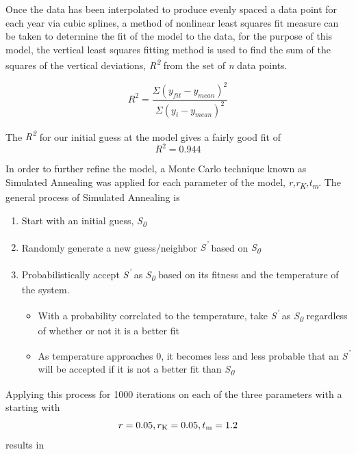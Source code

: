 \documentclass[12pt]{article}
\begin{document}
Once the data has been interpolated to produce evenly spaced a data point for each year via cubic splines, a method of nonlinear least squares fit measure can be taken to determine the fit of the model to the data, for the purpose of this model, the vertical least squares fitting method is used to find the sum of the squares of the vertical deviations, \textit{R\textsuperscript{2}} from the set of \textit{n} data points.


\begin{equation} R^2 = \frac{\Sigma(y_{fit} - y_{mean})^2} {\Sigma(y_{i} - y_{mean})^2}  \end{equation}


The \textit{R\textsuperscript{2}} for our initial guess at the model gives a fairly good fit of
\begin{equation} R^2 = 0.944 \end{equation}


In order to further refine the model, a Monte Carlo technique known as Simulated Annealing was applied for each parameter of the model,
\textit{r,r\textsubscript{K},t\textsubscript{m}}. The general process of Simulated Annealing is
\begin{enumerate}


\item{Start with an initial guess, \textit{S\textsubscript{0}}}
\item{Randomly generate a new guess/neighbor \textit{S\textsuperscript{'}}} based on \textit{S\textsubscript{0}}
\item{Probabilistically accept \textit{S\textsuperscript{'}} as \textit{S\textsubscript{0}} based on its fitness and the temperature of the system.}
\begin{itemize}
	\item{With a probability correlated to the temperature, take \textit{S\textsuperscript{'}} as \textit{S\textsubscript{0}} regardless of whether or not it is a better fit}
	\item{As temperature approaches 0, it becomes less and less probable that an \textit{S\textsuperscript{'}} will be accepted if it is not a better fit than \textit{S\textsubscript{0}}}
\end{itemize}
\end{enumerate}
Applying this process for 1000 iterations on each of the three parameters with a starting with 
\begin{equation} 
r=0.05,r\textsubscript{K}=0.05,t\textsubscript{m}=1.2
\end{equation}
results in
\end{document}
